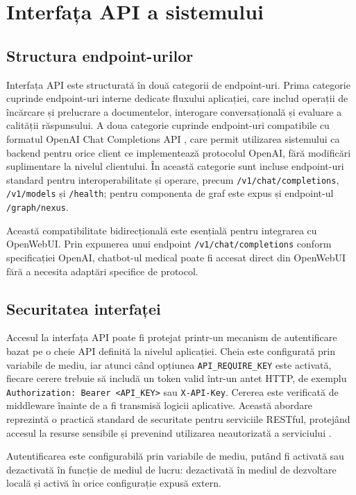 \documentclass[12pt, a4paper, oneside, romanian]{teza-upb}
\begin{document}
\section{Interfața API a sistemului}

\subsection{Structura endpoint-urilor}

Interfața API este structurată în două categorii de endpoint-uri. Prima categorie cuprinde endpoint-uri interne dedicate fluxului aplicației, care includ operații de încărcare și prelucrare a documentelor, interogare conversațională și evaluare a calității răspunsului. A doua categorie cuprinde endpoint-uri compatibile cu formatul OpenAI Chat Completions API \cite{openai_api}, care permit utilizarea sistemului ca backend pentru orice client ce implementează protocolul OpenAI, fără modificări suplimentare la nivelul clientului. În această categorie sunt incluse endpoint-uri standard pentru interoperabilitate și operare, precum \texttt{/v1/chat/completions}, \texttt{/v1/models} și \texttt{/health}; pentru componenta de graf este expus și endpoint-ul \texttt{/graph/nexus}.

Această compatibilitate bidirecțională este esențială pentru integrarea cu OpenWebUI. Prin expunerea unui endpoint \texttt{/v1/chat/completions} conform specificației OpenAI, chatbot-ul medical poate fi accesat direct din OpenWebUI fără a necesita adaptări specifice de protocol.

\subsection{Securitatea interfaței}

Accesul la interfața API poate fi protejat printr-un mecanism de autentificare bazat pe o cheie API definită la nivelul aplicației. Cheia este configurată prin variabile de mediu, iar atunci când opțiunea \texttt{API\_REQUIRE\_KEY} este activată, fiecare cerere trebuie să includă un token valid într-un antet HTTP, de exemplu \texttt{Authorization: Bearer <API\_KEY>} sau \texttt{X-API-Key}. Cererea este verificată de middleware înainte de a fi transmisă logicii aplicative. Această abordare reprezintă o practică standard de securitate pentru serviciile RESTful, protejând accesul la resurse sensibile și prevenind utilizarea neautorizată a serviciului \cite{flask_doc}.

Autentificarea este configurabilă prin variabile de mediu, putând fi 
activată sau dezactivată în funcție de mediul de lucru: 
dezactivată în mediul de dezvoltare locală și activă în orice 
configurație expusă extern.
\end{document}
